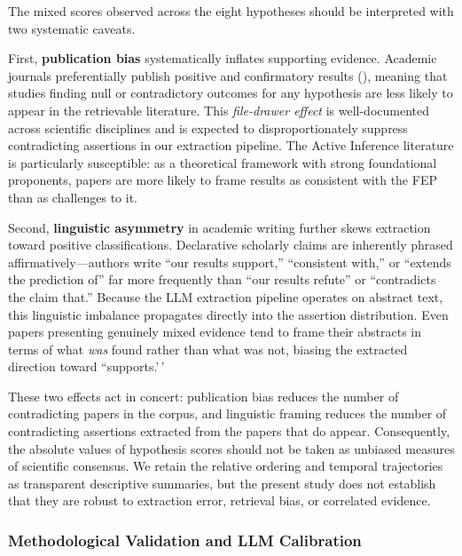 \documentclass[
  english,
]{article}
\begin{document}
The mixed scores observed across the eight hypotheses should be
interpreted with two systematic caveats.

First, \textbf{publication bias} systematically inflates supporting
evidence. Academic journals preferentially publish positive and
confirmatory results (\citep{sterling1959publication}), meaning that
studies finding null or contradictory outcomes for any hypothesis are
less likely to appear in the retrievable literature. This
\textit{file-drawer effect} is well-documented across scientific
disciplines and is expected to disproportionately suppress contradicting
assertions in our extraction pipeline. The Active Inference literature
is particularly susceptible: as a theoretical framework with strong
foundational proponents, papers are more likely to frame results as
consistent with the FEP than as challenges to it.

Second, \textbf{linguistic asymmetry} in academic writing further skews
extraction toward positive classifications. Declarative scholarly claims
are inherently phrased affirmatively---authors write ``our results
support,'' ``consistent with,'' or ``extends the prediction of'' far
more frequently than ``our results refute'' or ``contradicts the claim
that.'' Because the LLM extraction pipeline operates on abstract text,
this linguistic imbalance propagates directly into the assertion
distribution. Even papers presenting genuinely mixed evidence tend to
frame their abstracts in terms of what \textit{was} found rather than
what was not, biasing the extracted direction toward ``supports.'\,'

These two effects act in concert: publication bias reduces the number of
contradicting papers in the corpus, and linguistic framing reduces the
number of contradicting assertions extracted from the papers that do
appear. Consequently, the absolute values of hypothesis scores should
not be taken as unbiased measures of scientific consensus. We retain the
relative ordering and temporal trajectories as transparent descriptive
summaries, but the present study does not establish that they are robust
to extraction error, retrieval bias, or correlated evidence.

\subsubsection{Methodological Validation and LLM
Calibration}\label{methodological-validation-and-llm-calibration}
\end{document}
